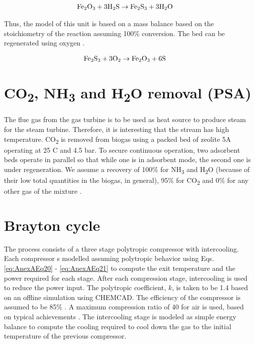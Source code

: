 \begin{refsection}[referencesCh2]
\begin{align}
	& \text{Fe\textsubscript{2}O\textsubscript{3}}  + 3\text{H\textsubscript{2}S} \rightarrow \text{Fe\textsubscript{2}S\textsubscript{3}}  + 3\text{H}_2 \text{O} \nonumber
\end{align}

Thus, the model of this unit is based on a mass balance based on the stoichiometry of the reaction assuming 100\% conversion. The bed can be regenerated using oxygen \citep{ryckebosch2011techniques}.

\begin{align}
	& \text{Fe\textsubscript{2}S\textsubscript{3}}  + 3\text{O\textsubscript{2}} \rightarrow  \text{Fe\textsubscript{2}O\textsubscript{3}} + 6\text{S} \nonumber
\end{align}

\section{CO\textsubscript{2}, NH\textsubscript{3} and H\textsubscript{2}O removal (PSA)}
The flue gas from the gas turbine is to be used as heat source to produce steam for the steam turbine. Therefore, it is interesting that the stream has high temperature. CO\textsubscript{2} is removed from biogas using a packed bed of zeolite 5A operating at 25 \textdegree C and 4.5 bar. To secure continuous operation, two adsorbent beds operate in parallel so that while one is in adsorbent mode, the second one is under regeneration. We assume a recovery of 100\% for NH\textsubscript{3} and H\textsubscript{2}O (because of their low total quantities in the biogas, in general), 95\% for CO\textsubscript{2} and 0\% for any other gas of the mixture \citep{russell2004gpsa, Nexant2006}. 

\section{Brayton cycle}
The process consists of a three stage polytropic compressor with intercooling. Each compressor s modelled assuming polytropic behavior using Eqs. \ref{eq:AnexAEq20} - \ref{eq:AnexAEq21} to compute the exit temperature and the power required for each stage. After each compression stage, intercooling is used to reduce the power input. The polytropic coefficient, $k$, is taken to be 1.4 based on an offline simulation using CHEMCAD\textregistered. The efficiency of the compressor is assumed to be 85\% \citep{Moran2003}. A maximum compression ratio of 40 for air is used, based on typical achievements \citep{Jane1997}. The intercooling stage is modeled as simple energy balance to compute the cooling required to cool down the gas to the initial temperature of the previous compressor.


\end{refsection}
